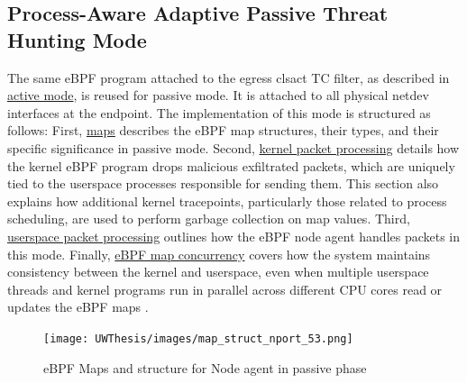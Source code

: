 \documentclass [11pt, proquest] {uwthesis}[2020/02/24]
\begin{document}
\subsection{Process-Aware Adaptive Passive Threat Hunting Mode}
\label{sec:passive}
The same eBPF program attached to the egress clsact TC filter, as described in \hyperref[sec:active]{active mode}, is reused for passive mode. It is attached to all physical netdev interfaces at the endpoint. The implementation of this mode is structured as follows: First, \hyperref[sec:maps]{maps} describes the eBPF map structures, their types, and their specific significance in passive mode. Second, \hyperref[passive:sec1]{kernel packet processing} details how the kernel eBPF program drops malicious exfiltrated packets, which are uniquely tied to the userspace processes responsible for sending them. This section also explains how additional kernel tracepoints, particularly those related to process scheduling, are used to perform garbage collection on map values. Third, \hyperref[passive:sec2]{userspace packet processing} outlines how the eBPF node agent handles packets in this mode. Finally, \hyperref[passive:sec3]{eBPF map concurrency} covers how the system maintains consistency between the kernel and userspace, even when multiple userspace threads and kernel programs run in parallel across different CPU cores read or updates the eBPF maps
.


\begin{figure}[H]
\centering
\texttt{[image: UWThesis/images/map\_struct\_nport\_53.png]}
\caption{eBPF Maps and structure for Node agent in passive phase}
\label{sec:dp_eBPF_LRU_Maps_passive}
\end{figure}
\end{document}
